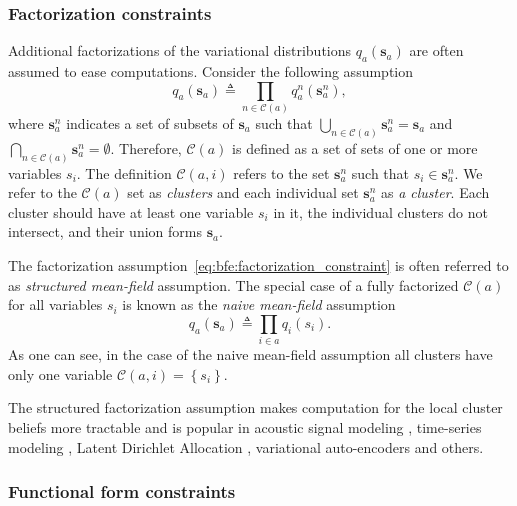 \subsubsection{Factorization constraints}

Additional factorizations of the variational distributions $q_a(\bm{s}_a)$ are often assumed
to ease computations.
Consider the following assumption \begin{equation}
    \label{eq:bfe:factorization_constraint}
    q_a(\bm{s}_a) \triangleq \prod_{n \in \mathcal{C}(a)} q^n_a(\bm{s}^n_a),
  \end{equation} where $\bm{s}^n_a$ indicates a set of
subsets of $\bm{s}_a$ such that $\bigcup_{n \in \mathcal{C}(a)} \bm{s}^n_a = \bm{s}_a$ and
$\bigcap_{n \in \mathcal{C}(a)} \bm{s}^n_a = \emptyset$.
Therefore, $\mathcal{C}(a)$ is defined as a set of sets of one or more variables $s_i$.
The definition $\mathcal{C}(a, i)$ refers to the set $\bm{s}^n_a$ such that $s_i \in
  \bm{s}^n_a$.
We refer to the $\mathcal{C}(a)$ set as \textit{clusters} and each individual set $\bm{s}^n_a$
as \textit{a cluster}.
Each cluster should have at least one variable $s_i$ in it, the individual clusters do not
intersect, and their union forms $\bm{s}_a$.

The factorization assumption~\eqref{eq:bfe:factorization_constraint} is often referred to as
\textit{structured mean-field} assumption.
The special case of a fully factorized $\mathcal{C}(a)$ for all variables $s_i$ is known as
the \textit{naive mean-field} assumption \citep{wainwright_graphical_2008}
\begin{equation}
  \label{eq:bfe:factorization_mean_field} q_a(\bm{s}_a) \triangleq \prod_{i \in a} q_i(s_i).
\end{equation} As one can see, in the case of the naive mean-field assumption all
clusters have only one variable $\mathcal{C}(a, i) = \left\{ s_i \right\}$.

The structured factorization assumption makes computation for the local cluster beliefs more tractable and
is popular in acoustic signal modeling \citep{logan_factorial_1998}, time-series modeling \citep{bamler_structured_2017}, Latent Dirichlet Allocation \citep{hoffman_structured_2014}, variational auto-encoders \citep{singh_structured_nodate} and others.

\subsubsection{Functional form constraints}

